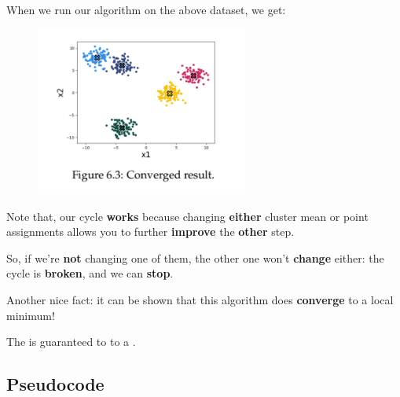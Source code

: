         When we run our algorithm on the above dataset, we get:
        
        \begin{figure}[H]
            \centering
            \includegraphics[width=70mm,scale=0.4]{images/clustering_images/converged_result_clustering.png}
        \end{figure}
        
        Note that, our cycle \textbf{works} because changing \textbf{either} cluster mean or point assignments allows you to further \textbf{improve} the \textbf{other} step.
        
        So, if we're \textbf{not} changing one of them, the other one won't \textbf{change} either: the cycle is \textbf{broken}, and we can \textbf{stop}. 
        
        Another nice fact: it can be shown that this algorithm does \textbf{converge} to a local minimum!\\
        
        \begin{concept}
            The  is guaranteed to  to a .
        \end{concept}
        
    \subsection*{Pseudocode}
    
